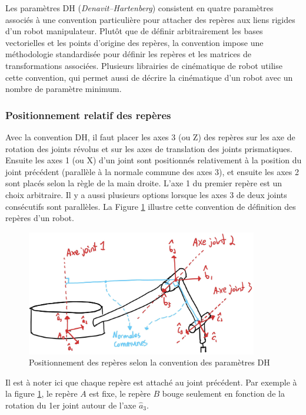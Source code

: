 Les paramètres DH (\textit{Denavit–Hartenberg}) consistent en quatre paramètres associés à une convention particulière pour attacher des repères aux liens rigides d'un robot manipulateur. Plutôt que de définir arbitrairement les bases vectorielles et les points d'origine des repères, la convention impose une méthodologie standardisée pour définir les repères et les matrices de transformations associées. Plusieurs librairies de cinématique de robot utilise cette convention, qui permet aussi de décrire la cinématique d'un robot avec un nombre de paramètre minimum.

\subsubsection{ Positionnement relatif des repères }

Avec la convention DH, il faut placer les axes 3 (ou Z) des repères sur les axe de rotation des joints révolus et sur les axes de translation des joints prismatiques. Ensuite les axes 1 (ou X) d'un joint sont positionnés relativement à la position du joint précédent (parallèle à la normale commune des axes 3), et ensuite les axes 2 sont placés selon la règle de la main droite. L'axe 1 du premier repère est un choix arbitraire. Il y a aussi plusieurs options lorsque les axes 3 de deux joints consécutifs sont parallèles. La Figure \ref{fig:dh1} illustre cette convention de définition des repères d'un robot.
\begin{figure}[H]
	\centering
		\includegraphics[width=0.90\textwidth]{fig/dh1.jpg}
	\caption{Positionnement des repères selon la convention des paramètres DH}
	\label{fig:dh1}
\end{figure}

Il est à noter ici que chaque repère est attaché au joint précédent. Par exemple à la figure \ref{fig:dh1}, le repère $A$ est fixe, le repère $B$ bouge seulement en fonction de la rotation du 1er joint autour de l'axe $\hat{a}_3$.

